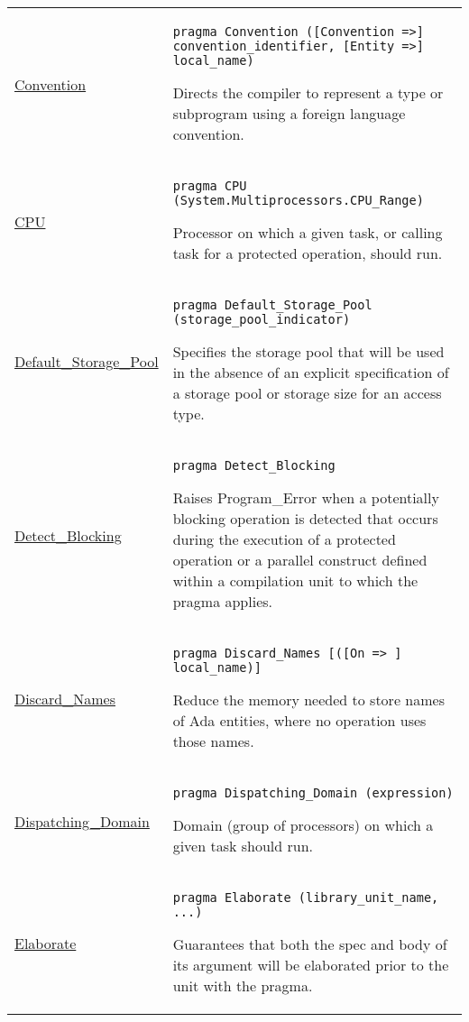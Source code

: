 \documentclass[english]{article}
\begin{document}
\begin{scriptsize}
\begin{multicols*}{3}
\begin{tabular}{@{}p{2cm}p{6.5cm}}
   \href{http://www.ada-auth.org/standards/22rm/html/RM-J-15-5.html}{Convention} & \texttt{pragma Convention ([Convention =>] convention\_identifier, [Entity =>] local\_name)}

   Directs the compiler to represent a type or subprogram using a foreign language convention.\\

   \href{http://www.ada-auth.org/standards/22rm/html/RM-J-15-9.html}{CPU} & \texttt{pragma CPU (System.Multiprocessors.CPU\_Range)}

   Processor on which a given task, or calling task for a protected operation, should run.\\

   \href{http://www.ada-auth.org/standards/22rm/html/RM-13-11-3.html}{Default\_Storage\_Pool} & \texttt{pragma Default\_Storage\_Pool (storage\_pool\_indicator)}

   Specifies the storage pool that will be used in the absence of an explicit specification of a storage pool or storage size for an access type.\\

   \href{http://www.ada-auth.org/standards/22rm/html/RM-H-5.html}{Detect\_Blocking} & \texttt{pragma Detect\_Blocking}

   Raises Program\_Error when a potentially blocking operation is detected that occurs during the execution of a protected operation or a parallel construct defined within a compilation unit to which the pragma applies.\\

   \href{http://www.ada-auth.org/standards/22rm/html/RM-C-5.html}{Discard\_Names} & \texttt{pragma Discard\_Names [([On => ] local\_name)]}

   Reduce the memory needed to store names of Ada entities, where no operation uses those names.\\

   \href{http://www.ada-auth.org/standards/22rm/html/RM-J-15-10.html}{Dispatching\_Domain} & \texttt{pragma Dispatching\_Domain (expression)}

   Domain (group of processors) on which a given task should run.\\

   \href{http://www.ada-auth.org/standards/22rm/html/RM-10-2-1.html}{Elaborate} & \texttt{pragma Elaborate (library\_unit\_name{, ...})}

   Guarantees that both the spec and body of its argument will be elaborated prior to the unit with the pragma.\\


\end{tabular}
\end{multicols*}
\end{scriptsize}
\end{document}

